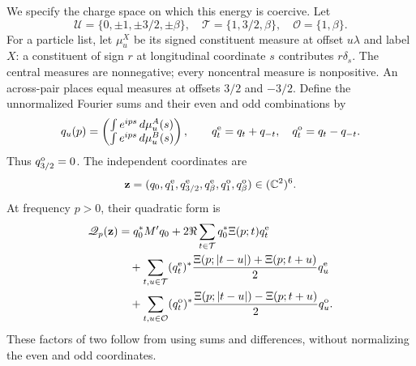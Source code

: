We specify the charge space on which this energy is coercive. Let
\[
 \mathcal U=\{0,\pm1,\pm3/2,\pm\beta\},\quad
 \mathcal T=\{1,3/2,\beta\},\quad \mathcal O=\{1,\beta\}.
\]
For a particle list, let \(\mu_u^X\) be its signed constituent measure at
offset \(u\lambda\) and label \(X\): a constituent of sign \(r\) at
longitudinal coordinate \(s\) contributes \(r\delta_s\). The central
measures are nonnegative; every noncentral measure is nonpositive.
An across-pair places equal measures at offsets \(3/2\) and \(-3/2\).
Define the unnormalized Fourier sums and their even and odd combinations by
\[
 q_u(p)=\begin{pmatrix}\int e^{ips}\,d\mu_u^A(s)\\
                         \int e^{ips}\,d\mu_u^B(s)\end{pmatrix},\qquad
 q_t^{\rm e}=q_t+q_{-t},\quad q_t^{\rm o}=q_t-q_{-t}.
\]
Thus \(q_{3/2}^{\rm o}=0\). The independent coordinates are
\[
 \mathbf z=(q_0,q_1^{\rm e},q_{3/2}^{\rm e},q_\beta^{\rm e},
                   q_1^{\rm o},q_\beta^{\rm o})\in(\mathbb C^2)^6.
\]
At frequency \(p>0\), their quadratic form is
\begin{align*}
 \mathscr Q_p(\mathbf z)
 &=q_0^*M'q_0+2\Re\sum_{t\in\mathcal T}q_0^*\Xi(p;t)q_t^{\rm e}\\
 &\quad+\sum_{t,u\in\mathcal T}
 (q_t^{\rm e})^*\frac{\Xi(p;|t-u|)+\Xi(p;t+u)}2q_u^{\rm e}\\
 &\quad+\sum_{t,u\in\mathcal O}
 (q_t^{\rm o})^*\frac{\Xi(p;|t-u|)-\Xi(p;t+u)}2q_u^{\rm o}.
\end{align*}
These factors of two follow from using sums and differences, without
normalizing the even and odd coordinates.

